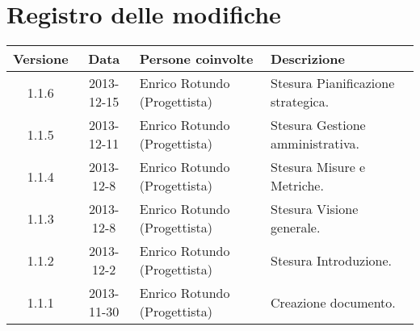 \section*{Registro delle modifiche}

\small{
\begin{tabularx}{\textwidth}{|c|c|l|X|}
 \hline \textbf{Versione} & \textbf{Data} & \textbf{Persone coinvolte} & \textbf{Descrizione} \\
 \hline 1.1.6 & 2013-12-15 & Enrico Rotundo (Progettista) & Stesura Pianificazione strategica. \\
 \hline 1.1.5 & 2013-12-11 & Enrico Rotundo (Progettista) & Stesura Gestione amministrativa. \\
 \hline 1.1.4 & 2013-12-8 & Enrico Rotundo (Progettista) & Stesura Misure e Metriche. \\
 \hline 1.1.3 & 2013-12-8 & Enrico Rotundo (Progettista) & Stesura Visione generale. \\
 \hline 1.1.2 & 2013-12-2 & Enrico Rotundo (Progettista) & Stesura Introduzione. \\
 \hline 1.1.1 & 2013-11-30 & Enrico Rotundo (Progettista) & Creazione documento. \\
 \hline
\end{tabularx}
}
